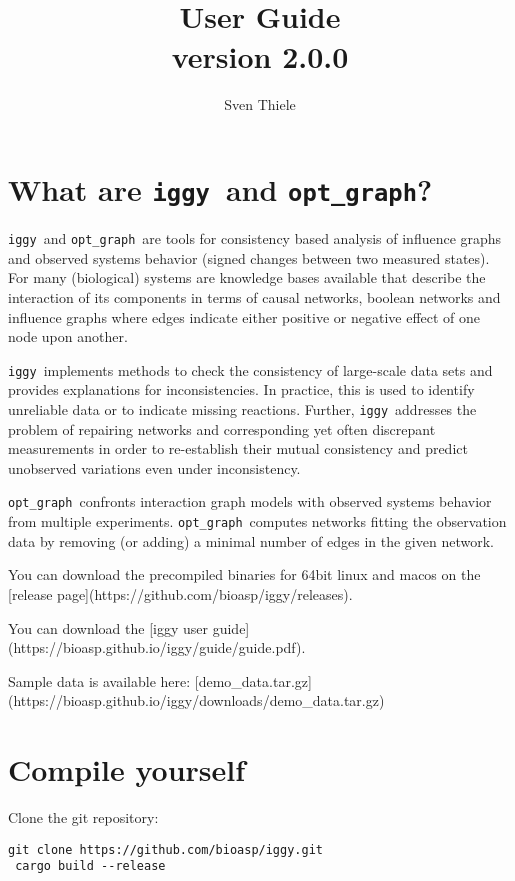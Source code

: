 \documentclass{article}
\title{ \iggy  \\
User Guide \\
version 2.0.0
}
\author{Sven Thiele}
\date{}
\newcommand\iggy{\texttt{iggy}}
\newcommand\optgraph{\texttt{opt\_graph}}
\begin{document}
\maketitle


\section{What are \iggy\ and \optgraph ?}

\iggy\ and \optgraph\ are tools for consistency based analysis of influence graphs and 
 observed systems behavior (signed changes between two measured states). 
For many (biological) systems are knowledge bases available that describe the interaction
 of its components in terms of causal networks, boolean networks and influence graphs
  where edges indicate either positive or negative effect of one node upon another.

\iggy\  implements methods to check the consistency of large-scale data sets and provides explanations 
for inconsistencies. 
In practice, this is used to identify unreliable data or to indicate missing reactions.
 Further, \iggy\ addresses the problem of repairing networks and corresponding yet often discrepant
  measurements in order to re-establish their mutual consistency and predict unobserved variations 
  even under inconsistency.

\optgraph\ confronts interaction graph models with observed systems behavior from multiple experiments. 
\optgraph\ computes networks fitting the observation data by removing (or adding) a minimal number of edges in the given network.

You can download the precompiled binaries for 64bit linux and macos on the [release page](https://github.com/bioasp/iggy/releases).

You can download the [iggy user guide](https://bioasp.github.io/iggy/guide/guide.pdf).


Sample data is available here: [demo_data.tar.gz](https://bioasp.github.io/iggy/downloads/demo_data.tar.gz)

\section{Compile yourself}

Clone the git repository:

\begin{Verbatim}[frame=single]
 git clone https://github.com/bioasp/iggy.git
 cargo build --release
\end{Verbatim}
\end{document}
